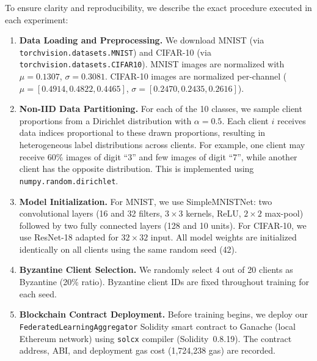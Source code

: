 \documentclass[12pt,a4paper,onecolumn]{article}
\begin{document}
To ensure clarity and reproducibility, we describe the exact procedure executed in each experiment:

\begin{enumerate}
    \item \textbf{Data Loading and Preprocessing.} We download MNIST (via \texttt{torchvision.datasets.MNIST}) and CIFAR-10 (via \texttt{torchvision.datasets.CIFAR10}). MNIST images are normalized with $\mu=0.1307$, $\sigma=0.3081$. CIFAR-10 images are normalized per-channel ($\mu=[0.4914, 0.4822, 0.4465]$, $\sigma=[0.2470, 0.2435, 0.2616]$).
    
    \item \textbf{Non-IID Data Partitioning.} For each of the 10 classes, we sample client proportions from a Dirichlet distribution with $\alpha=0.5$. Each client $i$ receives data indices proportional to these drawn proportions, resulting in heterogeneous label distributions across clients. For example, one client may receive 60\% images of digit ``3'' and few images of digit ``7'', while another client has the opposite distribution. This is implemented using \texttt{numpy.random.dirichlet}.
    
    \item \textbf{Model Initialization.} For MNIST, we use SimpleMNISTNet: two convolutional layers (16 and 32 filters, $3 \times 3$ kernels, ReLU, $2 \times 2$ max-pool) followed by two fully connected layers (128 and 10 units). For CIFAR-10, we use ResNet-18 adapted for $32 \times 32$ input. All model weights are initialized identically on all clients using the same random seed (42).
    
    \item \textbf{Byzantine Client Selection.} We randomly select 4 out of 20 clients as Byzantine (20\% ratio). Byzantine client IDs are fixed throughout training for each seed.
    
    \item \textbf{Blockchain Contract Deployment.} Before training begins, we deploy our \texttt{FederatedLearningAggregator} Solidity smart contract to Ganache (local Ethereum network) using \texttt{solcx} compiler (Solidity~0.8.19). The contract address, ABI, and deployment gas cost (1,724,238 gas) are recorded.
    

\end{enumerate}
\end{document}
